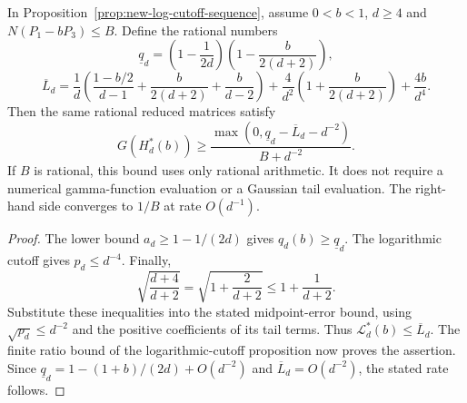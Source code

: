\begin{corollary}
\label{cor:new-rational-log-cutoff-bound}
In Proposition~\ref{prop:new-log-cutoff-sequence}, assume
$0<b<1$, $d\geq4$ and $N(P_1-bP_3)\leq B$. Define the rational numbers
\[
 \underline q_d=
 \left(1-\frac1{2d}\right)
 \left(1-\frac b{2(d+2)}\right),
\]
\[
 \overline L_d=
 \frac1d\left(\frac{1-b/2}{d-1}
                   +\frac b{2(d+2)}+\frac b{d-2}\right)
 +\frac4{d^2}\left(1+\frac b{2(d+2)}\right)
 +\frac{4b}{d^4}.
\]
Then the same rational reduced matrices satisfy
\[
 G(H_d^*(b))\geq
 \frac{\max(0,\underline q_d-\overline L_d-d^{-2})}{B+d^{-2}}.
\]
If $B$ is rational, this bound uses only rational arithmetic. It does
not require a numerical gamma-function evaluation or a Gaussian tail
evaluation. The right-hand side converges to $1/B$ at rate $O(d^{-1})$.
\end{corollary}
\begin{proof}
The lower bound $a_d\geq1-1/(2d)$ gives
$q_d(b)\geq\underline q_d$. The logarithmic cutoff gives
$p_d\leq d^{-4}$. Finally,
\[
 \sqrt{\frac{d+4}{d+2}}
 =\sqrt{1+\frac2{d+2}}\leq1+\frac1{d+2}.
\]
Substitute these inequalities into the stated midpoint-error bound,
using $\sqrt{p_d}\leq d^{-2}$ and the positive coefficients of its
tail terms. Thus $\mathcal L_d^*(b)\leq\overline L_d$.
The finite ratio bound of the logarithmic-cutoff proposition now proves
the assertion. Since $\underline q_d=1-(1+b)/(2d)+O(d^{-2})$ and
$\overline L_d=O(d^{-2})$, the stated rate follows.
\end{proof}
